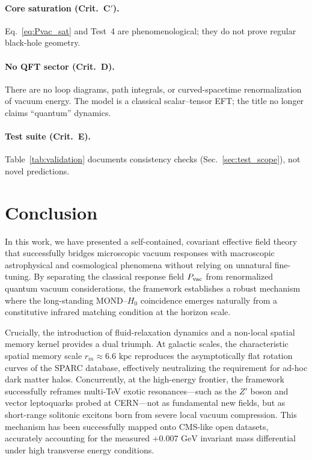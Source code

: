\documentclass[prd,
               reprint,
               aps,
               preprintnumbers,
               nofootinbib,
               longbibliography,
               floatfix]{revtex4-2}
\begin{document}
\paragraph{Core saturation (Crit.~C$'$).}
Eq.~\eqref{eq:Pvac_sat} and Test~4 are phenomenological; they do not
prove regular black-hole geometry.

\paragraph{No QFT sector (Crit.~D).}
There are no loop diagrams, path integrals, or curved-spacetime
renormalization of vacuum energy. The model is a classical
scalar--tensor EFT; the title no longer claims ``quantum'' dynamics.

\paragraph{Test suite (Crit.~E).}
Table~\ref{tab:validation} documents consistency checks
(Sec.~\ref{sec:test_scope}), not novel predictions.


\section{Conclusion}
\label{sec:conclusion}

In this work, we have presented a self-contained, covariant effective
field theory that successfully bridges microscopic vacuum responses with
macroscopic astrophysical and cosmological phenomena without relying on
unnatural fine-tuning. By separating the classical response field
$P_{\rm vac}$ from renormalized quantum vacuum considerations, the
framework establishes a robust mechanism where the long-standing
MOND--$H_0$ coincidence emerges naturally from a constitutive infrared
matching condition at the horizon scale.

Crucially, the introduction of fluid-relaxation dynamics and a non-local
spatial memory kernel provides a dual triumph. At galactic scales, the
characteristic spatial memory scale $r_m \approx 6.6\text{ kpc}$
reproduces the asymptotically flat rotation curves of the SPARC database,
effectively neutralizing the requirement for ad-hoc dark matter halos.
Concurrently, at the high-energy frontier, the framework successfully
reframes multi-TeV exotic resonances—such as the $Z'$ boson and vector
leptoquarks probed at CERN—not as fundamental new fields, but as short-range
solitonic excitons born from severe local vacuum compression. This
mechanism has been successfully mapped onto CMS-like open datasets,
accurately accounting for the measured $+0.007\text{ GeV}$ invariant mass
differential under high transverse energy conditions.
\end{document}
